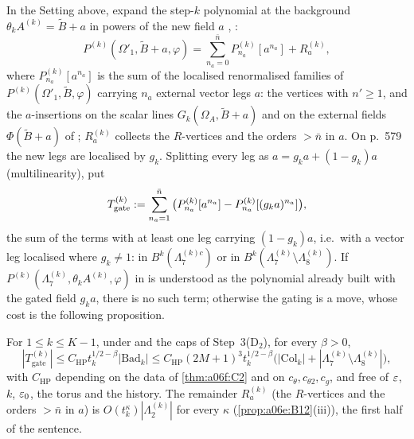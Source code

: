 
In the Setting above, expand the step-$k$ polynomial at the background $\theta_kA^{(k)}=\tilde B+a$ in powers of the new field $a$ \cite[(3.15), (3.44)]{Ba1}, \cite[p.~579]{Ba2}:
\[
P^{(k)}(\Omega'_1,\tilde B+a,\varphi)=\sum_{n_a=0}^{\bar n}P^{(k)}_{n_a}[a^{n_a}]+R^{(k)}_a,
\]
where $P^{(k)}_{n_a}[a^{n_a}]$ is the sum of the localised renormalised families of $P^{(k)}(\Omega'_1,\tilde B,\varphi)$ carrying $n_a$ external vector legs $a$: the vertices \cite[(1.8)--(1.11)]{Ba3} with $n'\ge1$, and the $a$-insertions on the scalar lines $G_k(\Omega_A,\tilde B+a)$ and on the external fields $\Phi(\tilde B+a)$ of \cite[(2.56)]{Ba2}; $R^{(k)}_a$ collects the $R$-vertices and the orders $>\bar n$ in $a$. On p.~579 the new legs are localised by $g_k$. Splitting every leg as $a=g_ka+(1-g_k)a$ (multilinearity), put
\[
T^{(k)}_{\mathrm{gate}}:=\sum_{n_a=1}^{\bar n}\big(P^{(k)}_{n_a}[a^{n_a}]-P^{(k)}_{n_a}[(g_ka)^{n_a}]\big),
\]
the sum of the terms with at least one leg carrying $(1-g_k)a$, i.e.\ with a vector leg localised where $g_k\ne1$: in $B^k(\Lambda^{(k)c}_7)$ or in $B^k(\Lambda^{(k)}_7\setminus\Lambda^{(k)}_8)$. If $P^{(k)}(\Lambda^{(k)}_7,\theta_kA^{(k)},\varphi)$ in \cite[(2.57)]{Ba2} is understood as the polynomial already built with the gated field $g_ka$, there is no such term; otherwise the gating is a move, whose cost is the following proposition.

\begin{proposition}\label{prop:a06g:HP}
For $1\le k\le K-1$, under \cite[(2.55)]{Ba2} and the caps of Step~3(D$_2$), for every $\beta>0$,
\[
|T^{(k)}_{\mathrm{gate}}|\le C_{\mathrm{HP}}t_k^{1/2-\beta}|\mathrm{Bad}_k|\le C_{\mathrm{HP}}(2M+1)^3t_k^{1/2-\beta}\big(|\mathrm{Col}_k|+|\Lambda^{(k)}_7\setminus\Lambda^{(k)}_8|\big),
\]
with $C_{\mathrm{HP}}$ depending on the data of \cref{thm:a06f:C2} and on $c_\theta,c_{\theta2},c_g$, and free of $\varepsilon$, $k$, $\varepsilon_0$, the torus and the history. The remainder $R^{(k)}_a$ (the $R$-vertices and the orders $>\bar n$ in $a$) is $O(t_k^\kappa)|\Lambda^{(k)}_2|$ for every $\kappa$ (\cref{prop:a06e:B12}(iii)), the first half of the sentence.
\end{proposition}

